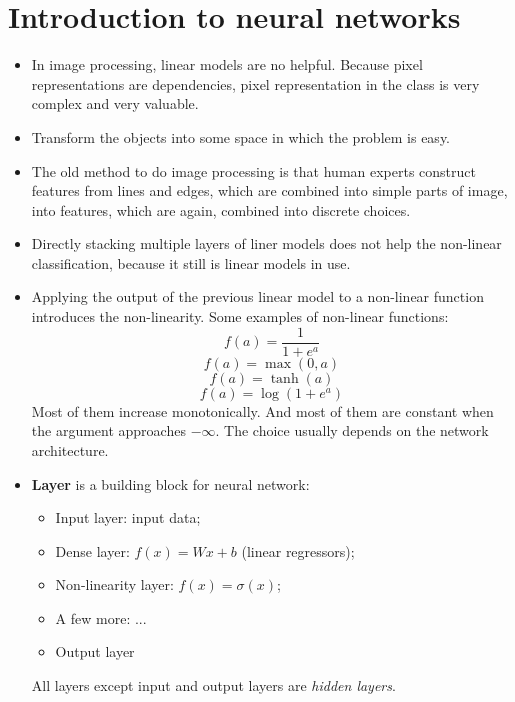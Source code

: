 \documentclass[]{article}
\begin{document}
\section{Introduction to neural networks}
\begin{itemize}
	\item In image processing, linear models are no helpful. Because pixel representations are dependencies, pixel representation in the class is very complex and very valuable.
	\item Transform the objects into some space in which the problem is easy.
	\item The old method to do image processing is that human experts construct features from lines and edges, which are combined into simple parts of image, into features, which are again, combined into discrete choices.
	\item Directly stacking multiple layers of liner models does not help the non-linear classification, because it still is linear models in use.
	\item Applying the output of the previous linear model to a non-linear function introduces the non-linearity. Some examples of non-linear functions:
	\begin{equation}
	f(a)=\frac{1}{1+e^a}
	\end{equation}
	\begin{equation}
	f(a)=\max{(0,a)}
	\end{equation}
	\begin{equation}
	f(a)=\tanh{(a)}
	\end{equation}
	\begin{equation}
	f(a) = \log{(1+e^a)}
	\end{equation}
	Most of them increase monotonically. And most of them are constant when the argument approaches $-\infty$. The choice usually depends on the network architecture.
	
	\item \textbf{Layer} is a building block for neural network:
	\begin{itemize}
		\item Input layer: input data;
		\item Dense layer: $f(x)=Wx+b$ (linear regressors);
		\item Non-linearity layer: $f(x)=\sigma(x)$;
		\item A few more: ...
		\item Output layer
	\end{itemize}
	All layers except input and output layers are \textit{hidden layers}.
	

\end{itemize}
\end{document}
